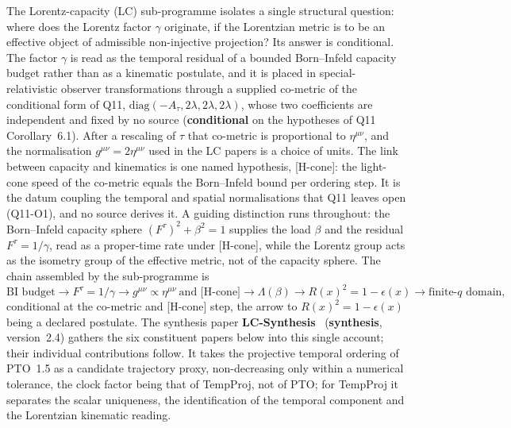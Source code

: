 \documentclass[11pt,a4paper]{article}
\newcommand{\ssynth}{\textcolor{csynth}{\textbf{synthesis}}}
\newcommand{\scond}{\textcolor{ccond}{\textbf{conditional}}}
\begin{document}
    The Lorentz-capacity (LC) sub-programme isolates a single structural question: where does the
    Lorentz factor $\gamma$ originate, if the Lorentzian metric is to be an effective object of admissible
    non-injective projection? Its answer is conditional. The factor $\gamma$ is read as the temporal residual of a
    bounded Born--Infeld capacity budget rather than as a kinematic postulate, and it is placed in
    special-relativistic observer transformations through a supplied co-metric of the conditional form of Q11,
    $\mathrm{diag}(-A_\tau, 2\lambda, 2\lambda, 2\lambda)$, whose two coefficients are independent and fixed by no
    source (\scond{} on the hypotheses of Q11 Corollary~6.1). After a rescaling of $\tau$ that co-metric is
    proportional to $\eta^{\mu\nu}$, and the normalisation $g^{\mu\nu} = 2\eta^{\mu\nu}$ used in the LC papers is a
    choice of units. The link between capacity and kinematics is one named hypothesis, [H-cone]: the light-cone
    speed of the co-metric equals the Born--Infeld bound per ordering step. It is the datum coupling the temporal
    and spatial normalisations that Q11 leaves open (Q11-O1), and no source derives it.
    A guiding distinction runs throughout: the Born--Infeld capacity
    sphere $(F^\tau)^2 + \beta^2 = 1$ supplies the load $\beta$ and the residual $F^\tau = 1/\gamma$, read as a
    proper-time rate under [H-cone], while
    the Lorentz group acts as the isometry group of the effective metric, not of the capacity sphere.
    The chain assembled by the sub-programme is
    \[
      \text{BI budget} \to F^\tau = 1/\gamma \to g^{\mu\nu} \propto \eta^{\mu\nu}\ \text{and [H-cone]}
      \to \Lambda(\beta) \to R(x)^2 = 1-\epsilon(x) \to \text{finite-}q\text{ domain,}
    \]
    conditional at the co-metric and [H-cone] step, the arrow to $R(x)^2 = 1-\epsilon(x)$ being a declared
    postulate.
    The synthesis paper \textbf{LC-Synthesis}~\cite{Beau2026lcsyn} (\ssynth, version~2.4) gathers the six
    constituent papers below into this single account; their individual contributions follow.
    It takes the projective temporal ordering of PTO~1.5 as a candidate trajectory proxy, non-decreasing only
    within a numerical tolerance, the clock factor being that of TempProj, not of PTO; for TempProj it separates
    the scalar uniqueness, the identification of the temporal component and the Lorentzian kinematic reading.
\end{document}

